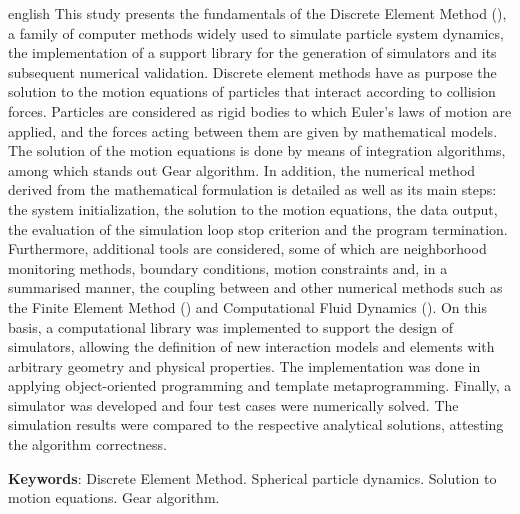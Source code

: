 \begin{resumo}[Abstract]
 \begin{otherlanguage*}{english}
   This study presents the fundamentals of the Discrete Element Method (\DEM{}), a family of computer methods widely used to simulate particle system dynamics, the implementation of a support library for the generation of simulators and its subsequent numerical validation. Discrete element methods have as purpose the solution to the motion equations of particles that interact according to collision forces. Particles are considered as rigid bodies to which Euler's laws of motion are applied, and the forces acting between them are given by mathematical models. The solution of the motion equations is done by means of integration algorithms, among which stands out Gear algorithm. In addition, the numerical method derived from the mathematical formulation is detailed as well as its main steps: the system initialization, the solution to the motion equations, the data output, the evaluation of the simulation loop stop criterion and the program termination. Furthermore, additional tools are considered, some of which are neighborhood monitoring methods, boundary conditions, motion constraints and, in a summarised manner, the coupling between \DEM{} and other numerical methods such as the Finite Element Method (\FEM{}) and Computational Fluid Dynamics (\CFD{}). On this basis, a computational library was implemented to support the design of \DEM{} simulators, allowing the definition of new interaction models and elements with arbitrary geometry and physical properties. The implementation was done in \CPP{} applying object-oriented programming and template metaprogramming. Finally, a simulator was developed and four test cases were numerically solved. The simulation results were compared to the respective analytical solutions, attesting the algorithm correctness.

   \vspace{\onelineskip}
 
   \noindent 
   \textbf{Keywords}: Discrete Element Method. Spherical particle dynamics. Solution to motion equations. Gear algorithm.
 \end{otherlanguage*}
\end{resumo}

%

